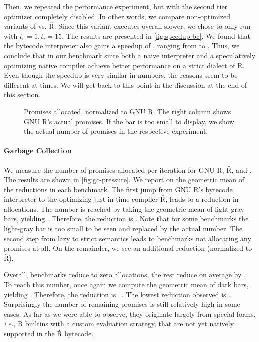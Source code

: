\documentclass[review,screen,acmsmall]{acmart}
\renewcommand{\Rsh}{{\sf\v R}\xspace}
\newcommand{\ie}{\emph{i.e.},\xspace}
\begin{document}
Then, we repeated the performance experiment, but with the second tier optimizer
completely disabled. In other words, we compare non-optimized variants of
\rshstrict vs. \Rsh. Since this variant executes overall \rshBCSlowdown slower,
we chose to only run with $t_e = 1, t_i = 15$. The results are presented in
\autoref{fig:speedup-bc}. We found that the bytecode interpreter also gains a
speedup of \speedupBCRshStrict, ranging from \speedupBCRshStrictMin to
\speedupBCRshStrictMax.
%
Thus, we conclude that in our benchmark suite both a naive interpreter and a
speculatively optimizing native compiler achieve better performance on a strict
dialect of R. Even though the speedup is very similar in numbers, the reasons
seem to be different at times. We will get back to this point in the discussion
at the end of this section.


\begin{figure}[h]
  \centering
  
  \caption{Promises allocated, normalized to GNU R. The right column shows GNU R's actual promises. If the bar is too small to display, we show the actual number of promises in the respective experiment.}
  \label{fig:gc-pressure}
\end{figure}

\paragraph{Garbage Collection}
We measure the number of promises allocated per iteration for GNU R, \Rsh, and
\rshstrict. The results are shown in \autoref{fig:gc-pressure}. We report on the
geometric mean of the reductions in each benchmark. The first jump from GNU R's
bytecode interpreter to the optimizing just-in-time compiler \Rsh, leads to a
\promiseAlocationReductionGnurRsh reduction in allocations. The number is
reached by taking the geometric mean of light-gray bars, yielding
\promiseAllocationGnurRsh. Therefore, the reduction is
\promiseAlocationReductionGnurRsh. Note that for some benchmarks the light-gray bar is
too small to be seen and replaced by the actual number. The second step from
lazy to strict semantics leads to \promiseAlocationReductionRshStrictToZero
benchmarks not allocating any promises at all. On the remainder, we see an
additional \promiseAlocationReductionRshStrict reduction (\rshstrict normalized
to \Rsh).

Overall, \promiseAlocationReductionRshStrictToZero benchmarks reduce to zero
allocations, the rest reduce on average by
\promiseAlocationReductionGnurRshStrict. To reach this number, once again we
compute the geometric mean of dark bars, yielding
\promiseAllocatioGnurRshStrict. Therefore, the reduction is
~\promiseAlocationReductionGnurRshStrict.
The lowest reduction observed is \promiseAlocationReductionGnurRshStrictMin.
Surprisingly the number of remaining promises is still relatively high in some
cases. As far as we were able to observe, they originate largely from special
forms, \ie R builtins with a custom evaluation strategy, that are not yet
natively supported in the \Rsh bytecode.
\end{document}
